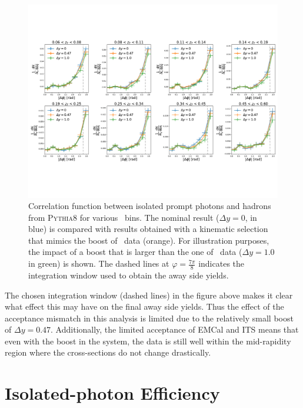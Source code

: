 \begin{figure}
\centering
\includegraphics[width = 1.0 \textwidth]{Checks_Systematics/PythiaStudyBoost_wLines}
\caption{Correlation function between isolated prompt photons and hadrons from \textsc{Pythia8} for various \zt~bins. The nominal result ($\Delta y =0$, in blue) is compared with results obtained with a kinematic selection that mimics the boost of \pPb~data (orange). For illustration purposes, the impact of a boost that is larger than the one of \pPb~data ($\Delta y = 1.0$ in green) is shown. The dashed lines at $\varphi = \frac{7\pi}{8} $ indicates the integration window used to obtain the away side yields.}
\label{fig:PythiaBoostStudy}
\end{figure}

The chosen integration window (dashed lines) in the figure above makes it clear what effect this may have on the final away side yields. Thus the effect of the acceptance mismatch in this analysis is limited due to the relatively small boost of $\Delta y = 0.47$. Additionally, the limited acceptance of EMCal and ITS means that even with the boost in the \pPb system, the data is still well within the mid-rapidity region where the cross-sections do not change drastically. 

\label{sec:EfficiencyAppendix}
\section{Isolated-photon Efficiency}

